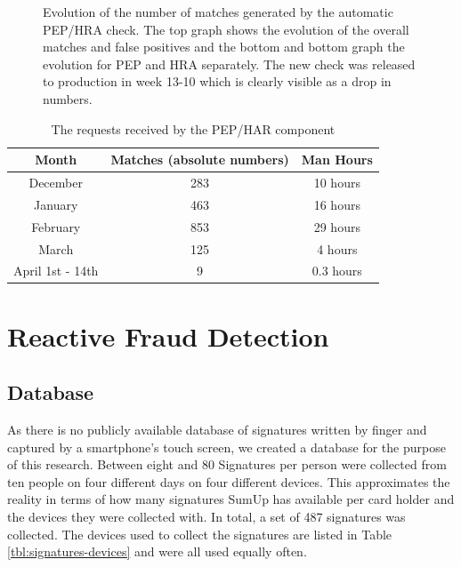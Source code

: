 \documentclass[a4paper, oneside]{csthesis}
\begin{document}
\begin{figure}
        \caption{Evolution of the number of matches generated by the automatic PEP/HRA check. The top graph shows the evolution of the overall matches and false positives and the bottom and bottom graph the evolution for PEP and HRA separately. The new check was released to production in week 13-10 which is clearly visible as a drop in numbers.}
        \label{fig:pep-hra-charts}
\end{figure}



\begin{table}[tb]
    \begin{center}
        \begin{tabular}{c|c|c}Month & Matches (absolute numbers) & Man Hours \\ \hline
        December & 283 & 10 hours \\ \hdashline[0.5pt/3pt]
        January & 463 & 16 hours  \\ \hdashline[0.5pt/3pt]
        February & 853 & 29 hours \\ \hline
        March & 125 & 4 hours \\ \hdashline[0.5pt/3pt]
        April 1st - 14th & 9 & 0.3 hours \\ \hline
        \end{tabular}
    \end{center}
    \caption{The requests received by the PEP/HAR component}
    \label{tbl:man-hours}
\end{table}


















\section{Reactive Fraud Detection}
\label{sec:exp-reactive}

\subsection{Database}

As there is no publicly available database of signatures written by finger and captured by a smartphone's touch screen, we created a database for the purpose of this research.
Between eight and 80 Signatures per person were collected from ten people on four different days on four different devices. This approximates the reality in terms of how many signatures SumUp has available per card holder and the devices they were collected with. In total, a set of 487 signatures was collected.
The devices used to collect the signatures are listed in Table \ref{tbl:signatures-devices} and were all used equally often.
\end{document}
